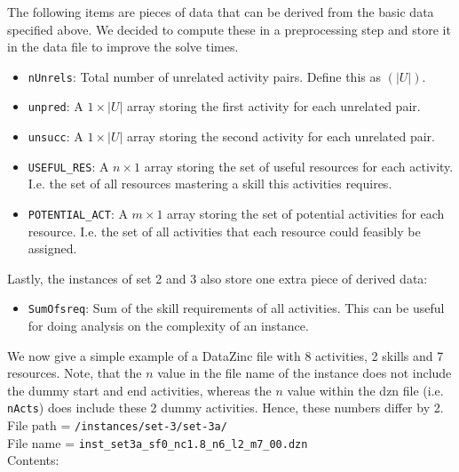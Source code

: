 \documentclass[12pt]{article}
\begin{document}
The following items are pieces of data that can be derived from the basic 
data specified above.
We decided to compute these in a preprocessing step and store it in the data file to 
improve the solve times.
\begin{itemize}
    \item {\tt nUnrels}: Total number of unrelated activity pairs. Define this as $(|U|)$.
    \item {\tt unpred}: A $1\times |U|$ array storing the first activity for each unrelated pair.
    \item {\tt unsucc}: A $1\times |U|$ array storing the second activity for each unrelated pair.
    \item {\tt USEFUL\_RES}: A $n\times 1$ array storing the set of useful resources for each activity.
        I.e. the set of all resources mastering a skill this activities requires.
    \item {\tt POTENTIAL\_ACT}: A $m\times 1$ array storing the set of potential activities for each resource.
        I.e. the set of all activities that each resource could feasibly be assigned.
\end{itemize}

Lastly, the instances of set 2 and 3 also store one extra piece of derived data:
\begin{itemize}
    \item {\tt SumOfsreq}: Sum of the skill requirements of all activities. This can
        be useful for doing analysis on the complexity of an instance.
\end{itemize}

We now give a simple example of a DataZinc file with 8 activities, 2 skills and 7 resources.
Note, that the $n$ value in the file name of the instance does not include the 
dummy start and end activities, whereas the $n$ value within the dzn file (i.e. {\tt nActs})
does include these 2 dummy activities. Hence, these numbers differ by 2.\\[3pt]
File path = {\tt /instances/set-3/set-3a/}\\[3pt]
File name = {\tt inst\_set3a\_sf0\_nc1.8\_n6\_l2\_m7\_00.dzn}\\[3pt]
Contents:
\end{document}
